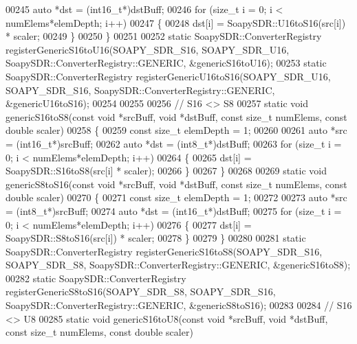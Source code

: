 \begin{DoxyCode}
00245   \textcolor{keyword}{auto} *dst = (int16\_t*)dstBuff;
00246   \textcolor{keywordflow}{for} (\textcolor{keywordtype}{size\_t} i = 0; i < numElems*elemDepth; i++)
00247     \{
00248       dst[i] = SoapySDR::U16toS16(src[i]) * scaler;
00249     \}
00250 \}
00251 
00252 \textcolor{keyword}{static} SoapySDR::ConverterRegistry registerGenericS16toU16(SOAPY_SDR_S16, 
      SOAPY_SDR_U16, SoapySDR::ConverterRegistry::GENERIC, &genericS16toU16);
00253 \textcolor{keyword}{static} SoapySDR::ConverterRegistry registerGenericU16toS16(SOAPY_SDR_U16, 
      SOAPY_SDR_S16, SoapySDR::ConverterRegistry::GENERIC, &genericU16toS16);
00254 
00255 
00256 \textcolor{comment}{// S16 <> S8}
00257 \textcolor{keyword}{static} \textcolor{keywordtype}{void} genericS16toS8(\textcolor{keyword}{const} \textcolor{keywordtype}{void} *srcBuff, \textcolor{keywordtype}{void} *dstBuff, \textcolor{keyword}{const} \textcolor{keywordtype}{size\_t} numElems, \textcolor{keyword}{const} \textcolor{keywordtype}{double} scaler)
00258 \{
00259   \textcolor{keyword}{const} \textcolor{keywordtype}{size\_t} elemDepth = 1;
00260 
00261   \textcolor{keyword}{auto} *src = (int16\_t*)srcBuff;
00262   \textcolor{keyword}{auto} *dst = (int8\_t*)dstBuff;
00263   \textcolor{keywordflow}{for} (\textcolor{keywordtype}{size\_t} i = 0; i < numElems*elemDepth; i++)
00264     \{
00265       dst[i] = SoapySDR::S16toS8(src[i] * scaler);
00266     \}
00267 \}
00268 
00269 \textcolor{keyword}{static} \textcolor{keywordtype}{void} genericS8toS16(\textcolor{keyword}{const} \textcolor{keywordtype}{void} *srcBuff, \textcolor{keywordtype}{void} *dstBuff, \textcolor{keyword}{const} \textcolor{keywordtype}{size\_t} numElems, \textcolor{keyword}{const} \textcolor{keywordtype}{double} scaler)
00270 \{
00271   \textcolor{keyword}{const} \textcolor{keywordtype}{size\_t} elemDepth = 1;
00272 
00273   \textcolor{keyword}{auto} *src = (int8\_t*)srcBuff;
00274   \textcolor{keyword}{auto} *dst = (int16\_t*)dstBuff;
00275   \textcolor{keywordflow}{for} (\textcolor{keywordtype}{size\_t} i = 0; i < numElems*elemDepth; i++)
00276     \{
00277       dst[i] = SoapySDR::S8toS16(src[i]) * scaler;
00278     \}
00279 \}
00280 
00281 \textcolor{keyword}{static} SoapySDR::ConverterRegistry registerGenericS16toS8(SOAPY_SDR_S16, 
      SOAPY_SDR_S8, SoapySDR::ConverterRegistry::GENERIC, &genericS16toS8);
00282 \textcolor{keyword}{static} SoapySDR::ConverterRegistry registerGenericS8toS16(SOAPY_SDR_S8, 
      SOAPY_SDR_S16, SoapySDR::ConverterRegistry::GENERIC, &genericS8toS16);
00283 
00284 \textcolor{comment}{// S16 <> U8}
00285 \textcolor{keyword}{static} \textcolor{keywordtype}{void} genericS16toU8(\textcolor{keyword}{const} \textcolor{keywordtype}{void} *srcBuff, \textcolor{keywordtype}{void} *dstBuff, \textcolor{keyword}{const} \textcolor{keywordtype}{size\_t} numElems, \textcolor{keyword}{const} \textcolor{keywordtype}{double} scaler)

\end{DoxyCode}
